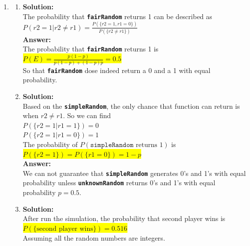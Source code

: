 \documentclass{article}
\newcommand{\myansw}{\textbf{Answer:}\\}
\newcommand{\mysolu}{\textbf{Solution:}\\}
\begin{document}
\begin{enumerate}
\begin{enumerate}
		${P(I)=\frac{6!}{3!}(p_1^3 p_2 p_3 p_4 + p_1 p_2^3 p_3 p_4 + p_1 p_2 p_3^3 p_4+ p_1 p_2 p_3 p_4^3) = 120(p_1^2+p_2^2+p_3^2+p_4^2) p_1 p_2 p_3 p_4}$\\
		\myansw
		\colorbox{yellow}{
		${P(E)=60(6p_5 + 3(p_1 p_2 + p_1 p_3 + p_1 p_4 + p_2 p_3 + p_2 p_4 + p_3 p_4)+2(p_1^2+p_2^2+p_3^2+p_4^2))p_1p_2p_3p_4}$}\\
		\item
		\myansw
		After substitute all the ${p_i}$ values, we can get\\
		\colorbox{yellow}{
			${P(E)=60\times(6\times 0.1 + 3\times 0.2925+2\times 0.225)\times 0.001875=0.2168}$
		}
		
	\end{enumerate}
	\item
	\begin{enumerate}
		\item
		\mysolu
		The probability that \textbf{\texttt{fairRandom}} returns 1 can be described as\\
		${P({r2 = 1|r2\neq r1})=\frac{P(\{r2 = 1, r1 = 0\})}{P(\{r2 \neq r1\})}}$\\
		\myansw
		The probability that \textbf{\texttt{fairRandom}} returns 1 is\\
		\colorbox{yellow}{${P(E)= \frac{p(1-p)}{p(1-p)+(1-p)p}=0.5}$}\\
		So that \textbf{\texttt{fairRandom}} dose indeed return a 0 and a 1 with equal probability.
		\item
		\mysolu
		Based on the \textbf{\texttt{simpleRandom}}, the only chance that function can return is when ${r2 \neq r1}$. So we can find\\
		${P(\{r2 = 1|r1 = 1\})=0}$\\
		${P(\{r2 = 1|r1 = 0\})=1}$\\
		The probability of ${P(\texttt{simpleRandom}\text{ returns 1})}$ is\\
		\colorbox{yellow}{
		${P(\{r2 = 1\})=P(\{r1=0\})=1-p}$}\\
		\myansw
		We can not guarantee that \textbf{\texttt{simpleRandom}} generates 0's and 1's with equal probability unless \textbf{\texttt{unknownRandom}} returns 0's and 1's with equal probability ${p = 0.5}$.
		\item
		\mysolu
		After run the simulation, the probability that second player wins is\\
		\colorbox{yellow}{${P(\{\text{second player wins}\}) = 0.516}$}\\
		Assuming all the random numbers are integers.\\

\end{enumerate}
\end{enumerate}
\end{document}
